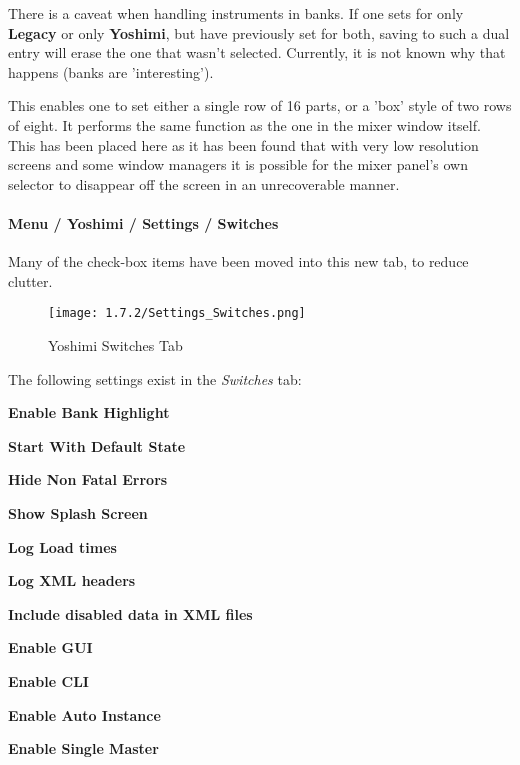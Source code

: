    There is a caveat when handling instruments in banks. If one sets for
   only \textbf{Legacy} or only \textbf{Yoshimi}, but have previously set
   for both, saving to such a dual entry will erase the one that wasn't
   selected. Currently, it is not known why that happens (banks are
   'interesting').

   This enables one to set either a single row of 16 parts, or a 'box'
   style of two rows of eight. It performs the same function as the one
   in the mixer window itself. This has been placed here as it has been
   found that with very low resolution screens and some window managers
   it is possible for the mixer panel's own selector to disappear off the
   screen in an unrecoverable manner.

\paragraph{Menu / Yoshimi / Settings / Switches}
\label{paragraph:menu_yoshimi_settings_switches}

   Many of the check-box items have been moved into this new tab, to reduce
   clutter.

\begin{figure}[H]
   \centering
   \texttt{[image: 1.7.2/Settings\_Switches.png]}
   \caption{Yoshimi Switches Tab}
   \label{fig:yoshimi_settings_switches_tab}
\end{figure}

   The following settings exist in the \textsl{Switches} tab:

   \begin{enumber}
      \item \textbf{Enable Bank Highlight}
      \item \textbf{Start With Default State}
      \item \textbf{Hide Non Fatal Errors}
      \item \textbf{Show Splash Screen}
      \item \textbf{Log Load times}
      \item \textbf{Log XML headers}
      \item \textbf{Include disabled data in XML files}
      \item \textbf{Enable GUI}
      \item \textbf{Enable CLI}
      \item \textbf{Enable Auto Instance}
      \item \textbf{Enable Single Master}
   \end{enumber}

